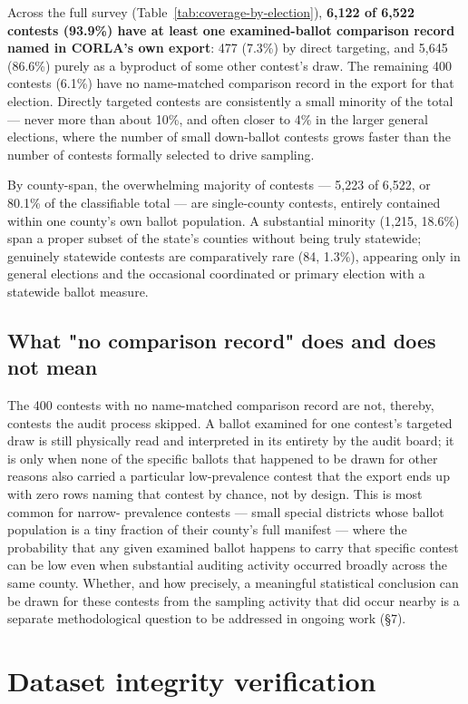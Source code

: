 Across the full survey (Table~\ref{tab:coverage-by-election}), \textbf{6,122 of 6,522 contests (93.9\%) have at least one
examined-ballot comparison record named in CORLA's own export}: 477 (7.3\%)
by direct targeting, and 5,645 (86.6\%) purely as a byproduct of some other
contest's draw. The remaining 400 contests (6.1\%) have no name-matched
comparison record in the export for that election. Directly targeted
contests are consistently a small minority of the total — never more than
about 10\%, and often closer to 4\% in the larger general elections, where
the number of small down-ballot contests grows faster than the number of
contests formally selected to drive sampling.

By county-span, the overwhelming majority of contests — 5,223 of 6,522, or
80.1\% of the classifiable total — are single-county contests, entirely
contained within one county's own ballot population. A substantial minority
(1,215, 18.6\%) span a proper subset of the state's counties without being
truly statewide; genuinely statewide contests are comparatively rare (84,
1.3\%), appearing only in general elections and the occasional coordinated
or primary election with a statewide ballot measure.

\subsection{What "no comparison record" does and does not mean}

The 400 contests with no name-matched comparison record are not,
thereby, contests the audit process skipped. A ballot examined for one
contest's targeted draw is still physically read and interpreted in its
entirety by the audit board; it is only when none of the specific ballots
that happened to be drawn for other reasons also carried a particular
low-prevalence contest that the export ends up with zero rows naming that
contest by chance, not by design. This is most common for narrow-
prevalence contests — small special districts whose ballot population is a
tiny fraction of their county's full manifest — where the probability that
any given examined ballot happens to carry that specific contest can be
low even when substantial auditing activity occurred broadly across the
same county. Whether, and how precisely, a meaningful statistical
conclusion can be drawn for these contests from the sampling activity that
did occur nearby is a separate methodological question to be addressed in
ongoing work (§7).

\section{Dataset integrity verification}

